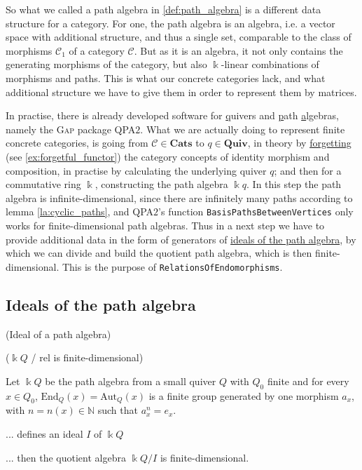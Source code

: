So what we called a path algebra in \ref{def:path_algebra} is a different data structure for a category. 
For one, the path algebra is an algebra, i.e. a vector space with additional structure, and thus a single set, comparable to the
class of morphisms $\mathcal{C}_{1}$ of a category $\mathcal{C}$.
But as it is an algebra, it not only contains the generating morphisms of the category, but also $\Bbbk$-linear combinations of
morphisms and paths. This is what our concrete categories lack, and what additional structure we have to give them in order
to represent them by matrices.

In practise, there is already developed software for \ul{q}uivers and \ul{p}ath \ul{a}lgebras, namely the \textsc{Gap} package
\textsc{QPA$2$}.
What we are actually doing to represent finite concrete categories, is going from $\mathcal{C} \in \mathbf{Cats}$ to $q \in \mathbf{Quiv}$,
in theory by \ul{forgetting} (see \ref{ex:forgetful_functor}) the category concepts of identity morphism and composition, in practise by calculating the
underlying quiver $q$; and then for a commutative ring $\Bbbk$, constructing the path algebra $\Bbbk q$. In this step the path algebra
is infinite-dimensional, since there are infinitely many paths according to lemma \ref{la:cyclic_paths}, and \textsc{QPA$2$}'s function
\texttt{BasisPathsBetweenVertices} only works for finite-dimensional path algebras. Thus in a next step we have to provide
additional data in the form of generators of \ul{ideals of the path algebra}, by which we can divide and build the quotient path algebra,
which is then finite-dimensional. This is the purpose of \texttt{RelationsOfEndomorphisms}.

\subsection{Ideals of the path algebra}

\begin{definition}{(Ideal of a path algebra)}

\end{definition}

\begin{lemma}{($\Bbbk Q$ / rel is finite-dimensional)}

Let $\Bbbk Q$ be the path algebra from a small quiver $Q$ with $Q_{0}$ finite and for every $x \in Q_{0}$, $\mathrm{End}_{Q}(x) = \mathrm{Aut}_{Q}(x)$
is a finite group generated by one morphism $a_{x}$, with $n = n(x) \in \mathbb{N}$ such that $a_{x}^{n} = e_{x}$.



... defines an ideal $I$ of $\Bbbk Q$

... then the quotient algebra $\Bbbk Q / I$ is finite-dimensional.
\end{lemma}

